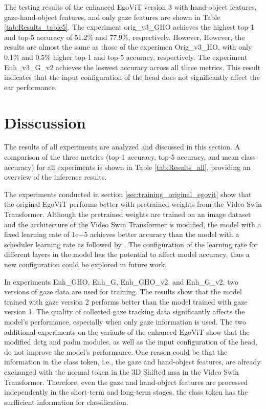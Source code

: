 \vspace{5mm}
The testing results of the enhanced EgoViT version 3 with hand-object features, gaze-hand-object features, and only gaze features are shown in Table \ref{tab:Results_table5}. The experiment orig\_v3\_GHO achieves the highest top-1 and top-5 accuracy of 51.2\% and 77.9\%, respectively. However, However, the results are almost the same as those of the experimen Orig\_v3\_HO, with only 0.1\% and 0.5\% higher top-1 and top-5 accuracy, respectively. The experiment Enh\_v3\_G\_v2 achieves the loswest accuracy across all three metrics. This result indicates that the input configuration of the head does not significantly affect the \gls{ear} performance.

\section{Disscussion}
\label{sec:Disscussion}
The results of all experiments are analyzed and discussed in this section. A comparison of the three metrics (top-1 accuracy, top-5 accuracy, and mean class accuracy) for all experiments is shown in Table \ref{tab:Results_all}, providing an overview of the inference results.

The experiments conducted in section \ref{sec:training_original_egovit} show that the original EgoViT performs better with pretrained weights from the Video Swin Transformer. Although the pretrained weights are trained on an image dataset and the architecture of the Video Swin Transformer is modified, the model with a fixed learning rate of $1 \mathrm{e}{-5}$ achieves better accuracy than the model with a scheduler learning rate as followed by \cite{liu_video_2021}. The configuration of the learning rate for different layers in the model has the potential to affect model accuracy, thus a new configuration could be explored in future work.

In experiments Enh\_GHO, Enh\_G, Enh\_GHO\_v2, and Enh\_G\_v2, two versions of gaze data are used for training. The results show that the model trained with gaze version 2 performs better than the model trained with gaze version 1. The quality of collected gaze tracking data significantly affects the model's performance, especially when only gaze information is used. The two additional experiments on the variants of the enhanced EgoViT show that the modified \gls{dctg} and \gls{padm} modules, as well as the input configuration of the head, do not improve the model's performance. One reason could be that the information in the class token, i.e., the gaze and hand-object features, are already exchanged with the normal token in the 3D Shifted \gls{msa} in the Video Swin Transformer. Therefore, even the gaze and hand-object features are processed independently in the short-term and long-term stages, the class token has the surfficient information for classification.


